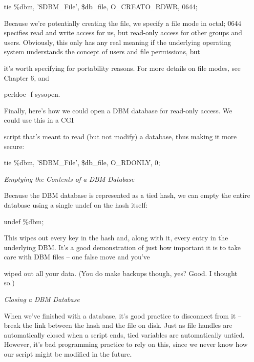 \documentclass[a4paper,11pt]{book}
\begin{document}
\noindent 

\noindent tie \%dbm, 'SDBM\_File', \$db\_file, O\_CREAT\textbar O\_RDWR, 0644;

\noindent 

\noindent Because we're potentially creating the file, we specify a file mode in octal; 0644 specifies read and write access for us, but read-only access for other groups and users. Obviously, this only has any real meaning if the underlying operating system understands the concept of users and file permissions, but

\noindent it's worth specifying for portability reasons. For more details on file modes, see Chapter 6, and

\noindent perldoc -f sysopen.

\noindent 

\noindent Finally, here's how we could open a DBM database for read-only access. We could use this in a CGI

\noindent script that's meant to read (but not modify) a database, thus making it more secure:

\noindent 

\noindent tie \%dbm, 'SDBM\_File', \$db\_file, O\_RDONLY, 0;

\noindent 

\noindent \textit{Emptying the Contents of a DBM Database}

\noindent Because the DBM database is represented as a tied hash, we can empty the entire database using a single undef on the hash itself:

\noindent 

\noindent undef \%dbm;

\noindent 

\noindent This wipes out every key in the hash and, along with it, every entry in the underlying DBM. It's a good demonstration of just how important it is to take care with DBM files -- one false move and you've

\noindent wiped out all your data. (You do make backups though, yes? Good. I thought so.)

\noindent 

\noindent \textit{Closing a DBM Database}

\noindent When we've finished with a database, it's good practice to disconnect from it -- break the link between the hash and the file on disk. Just as file handles are automatically closed when a script ends, tied variables are automatically untied. However, it's bad programming practice to rely on this, since we never know how our script might be modified in the future.
\end{document}
